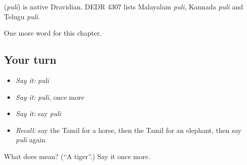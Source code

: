 \begin{cousinweb}
\textbf{} (\emph{puli}) is native Dravidian. DEDR 4307 lists Malayalam \emph{puli}, Kannada \emph{puli} and Telugu \emph{puli}.
\end{cousinweb}

\begin{grammarlens}[title={What you've built}]
One more word for this chapter.
\end{grammarlens}

\subsection*{Your turn}
\begin{itemize}
\raggedright
  \item \emph{Say it:} \emph{puli}
  \item \emph{Say it:} \emph{puli}, once more
  \item \emph{Say it:} say \emph{puli}
  \item \emph{Recall:} say the Tamil for a horse, then the Tamil for an elephant, then say \emph{puli} again
\end{itemize}

\begin{tcolorbox}[breakable,colback=teal!4,colframe=teal!35!black,title={Before you move on}]
What does  mean? (\textquotedblleft{}A tiger\textquotedblright{}.) Say it once more.
\end{tcolorbox}
